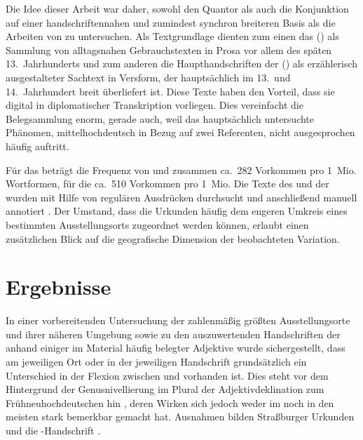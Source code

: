 Die Idee dieser Arbeit war daher, sowohl den Quantor als auch die Konjunktion
 auf einer handschriftennahen und zumindest synchron breiteren
Basis als die Arbeiten von \citet{askedal1973,askedal1974} zu untersuchen. Als
Textgrundlage dienten zum einen das  () als
Sammlung von alltagsnahen Gebrauchstexten in Prosa vor allem des späten
13.~Jahrhunderts und zum anderen die Haupthandschriften der 
(\citet{kc}) als erzählerisch ausgestalteter Sachtext in Versform, der
hauptsächlich im 13.\ und 14.\ Jahrhundert breit über\-liefert ist. Diese Texte
haben den Vorteil, dass sie digital in diplomatischer Transkription vorliegen.
Dies vereinfacht die Belegsammlung enorm, gerade auch, weil das hauptsächlich
untersuchte Phänomen, mittelhochdeutsch   in Bezug auf
zwei Referenten, nicht ausgesprochen häufig auftritt.

Für das  beträgt die Frequenz von  und 
zusammen ca.~282 Vorkommen pro 1~Mio. Wortformen, für die \citet{kc} ca.~510
Vorkommen pro 1~Mio. Die Texte des  und der \citet{kc} wurden
mit Hilfe von regulären Ausdrücken durchsucht und anschließend manuell
annotiert \autocites[vgl.\ z.\,B.][33--37]{perkuhnetal2012}[zur Methode
vgl.][207--209]{beckerschallert2021}[155--158]{beckerschallert2022b}. Der
Umstand, dass die Urkunden häufig dem engeren Umkreis eines bestimmten
Ausstellungs\-orts zugeordnet werden können, erlaubt einen zusätzlichen Blick
auf die geografische Dimension der beobachteten Variation.

\section{Ergebnisse}

In einer vorbereitenden Untersuchung der zahlenmäßig größten Ausstellungsorte
und ihrer näheren Umgebung sowie zu den auszuwertenden Handschriften der
\citet{kc} anhand einiger im Material häufig belegter Adjektive wurde
sichergestellt, dass am jeweiligen Ort oder in der jeweiligen Handschrift
grundsätzlich ein Unterschied in der Flexion zwischen  und
 vorhanden ist. Dies steht vor dem Hintergrund der Genusnivellierung
im Plural der Adjektivdeklination zum Frühneuhochdeutschen hin
\autocite[191--192]{reichmannwegera1993}, deren Wirken sich jedoch weder im
 noch in den meisten \citet{kc} stark bemerkbar gemacht hat.
Ausnahmen bilden Straßburger Urkunden und die \citet{kc}-Handschrift
\citet{kc:Z}.

